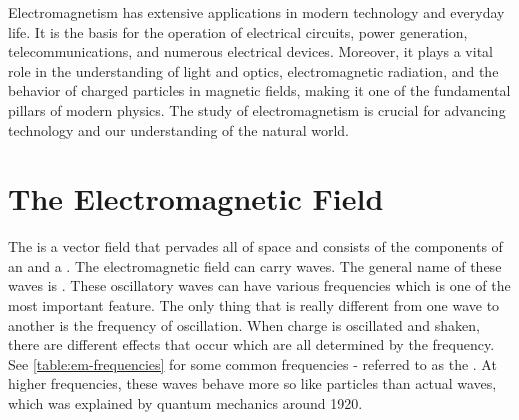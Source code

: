 Electromagnetism has extensive applications in modern technology and everyday life. It is the basis for the operation of electrical circuits, power generation, telecommunications, and numerous electrical devices. Moreover, it plays a vital role in the understanding of light and optics, electromagnetic radiation, and the behavior of charged particles in magnetic fields, making it one of the fundamental pillars of modern physics. The study of electromagnetism is crucial for advancing technology and our understanding of the natural world. 






\section{The Electromagnetic Field}

The  is a vector field that pervades all of space and consists of the components of an  and a . The electromagnetic field can carry waves. The general name of these waves is . These oscillatory waves can have various frequencies which is one of the most important feature. The only thing that is really different from one wave to another is the frequency of oscillation. When charge is oscillated and shaken, there are different effects that occur which are all determined by the frequency. See \ref{table:em-frequencies} for some common frequencies - referred to as the . At higher frequencies, these waves behave more so like particles than actual waves, which was explained by quantum mechanics around 1920.

